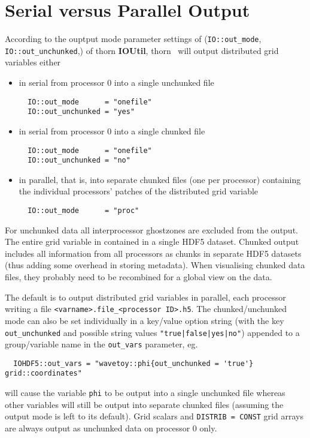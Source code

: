 \documentclass{article}
\begin{document}
\section{Serial versus Parallel Output}

According to the ouptput mode parameter settings of ({\tt IO::out\_mode},
{\tt IO::out\_unchunked},) of thorn
{\bf IOUtil}, thorn \ThisThorn\ will output distributed grid variables either

\begin{itemize}
  \item in serial from processor 0 into a single unchunked file
\begin{verbatim}
  IO::out_mode      = "onefile"
  IO::out_unchunked = "yes"
\end{verbatim}

  \item in serial from processor 0 into a single chunked file
\begin{verbatim}
  IO::out_mode      = "onefile"
  IO::out_unchunked = "no"
\end{verbatim}

  \item in parallel, that is, into separate chunked files (one per processor)
        containing the individual processors' patches of the
        distributed grid variable
\begin{verbatim}
  IO::out_mode      = "proc"
\end{verbatim}
\end{itemize}

For unchunked data all interprocessor ghostzones are excluded from the output.
The entire grid variable in contained in a single HDF5 dataset.
Chunked output includes all information from all processors as chunks in
separate HDF5 datasets (thus adding some overhead in storing metadata).
When visualising chunked data files, they probably need to be recombined
for a global view on the data.

The default is to output distributed grid variables in parallel, each processor
writing a file
{\tt \textless varname\textgreater.file\_\textless processor ID\textgreater.h5}.
The chunked/unchunked mode can also be set individually in a key/value
option string (with the key {\tt out\_unchunked} and possible string values
{\tt "true|false|yes|no"}) appended to a group/variable name in the
{\tt out\_vars} parameter, eg.
\begin{verbatim}
  IOHDF5::out_vars = "wavetoy::phi{out_unchunked = 'true'}  grid::coordinates"
\end{verbatim}
will cause the variable {\tt phi} to be output into a single unchunked file
whereas other variables will still be output into separate chunked files
(assuming the output mode is left to its default).
Grid scalars
and {\tt DISTRIB = CONST} grid arrays are always output as unchunked data
on processor 0 only.
\end{document}
